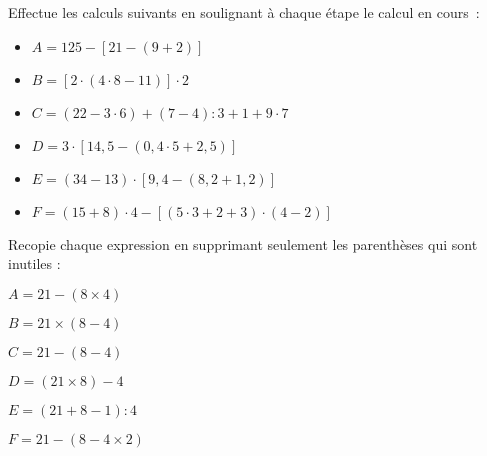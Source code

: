 \begin{exercice}
Effectue les calculs suivants en soulignant à chaque étape le calcul en cours :
\begin{itemize}
 \item $A = 125 - [21 - (9 + 2)]$
 
 \dotfill		

 \dotfill
 
 \dotfill

\vspace*{5em}


 \item $B = [2 \cdot (4 \cdot 8 - 11)] \cdot 2$	

 \dotfill	

 \dotfill

 \dotfill
	
 \item $C = (22 - 3 \cdot 6) + (7 - 4) : 3 + 1 + 9 \cdot 7$  	

 \dotfill	

 \dotfill	

 \dotfill

 \dotfill
 
 \dotfill
	
 \item $D = 3 \cdot [14,5 - (0,4 \cdot 5 + 2,5)]$
	
 \dotfill		

 \dotfill

 \dotfill

 \dotfill
	
 \item $E = (34 - 13) \cdot [9,4 - (8,2 + 1,2)]$

 \dotfill

 \dotfill

 \dotfill

 \dotfill
	
 \item $F = (15 + 8) \cdot 4 - [(5 \cdot 3 + 2 + 3) \cdot (4 - 2)]$
 
 \dotfill	

 \dotfill
 
 \dotfill

 \dotfill
 \end{itemize}
\end{exercice}

\begin{exercice}
Recopie chaque expression en supprimant seulement les parenthèses qui sont inutiles :

$A = 21 - ( 8 \times 4 )$ \dotfill

$B = 21 \times ( 8 - 4 )$ \dotfill

$C = 21 - ( 8 - 4 )$ \dotfill

$D = ( 21 \times 8 ) - 4$ \dotfill

$E = ( 21 + 8 - 1 ) : 4$  \dotfill

$F = 21 - ( 8 - 4 \times 2 )$ \dotfill
\end{exercice}


